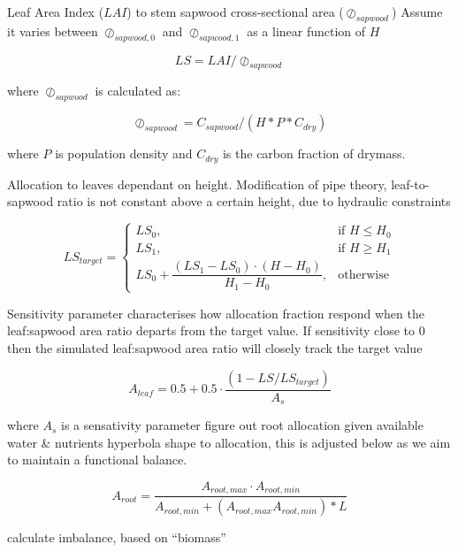 Leaf Area Index ($LAI$) to stem sapwood cross-sectional area ($\oslash_{sapwood}$)
Assume it varies between $\oslash_{sapwood,0}$ and $\oslash_{sapwood,1}$ as a linear function of $H$ 

\begin{equation}
	LS = LAI / \oslash_{sapwood}
\end{equation}

where $\oslash_{sapwood}$ is calculated as:

\begin{equation}
	\oslash_{sapwood} = C_{sapwood}/(H * P *C_{dry} )
\end{equation}

where $P$ is population density and $C_{dry}$ is the carbon fraction of drymass.

Allocation to leaves dependant on height. Modification of pipe theory, leaf-to-sapwood ratio is not constant above a certain  height, due to hydraulic constraints \citep{Magnani2000,Deckmun2006}

\begin{equation}
	LS_{target}=
	\begin{cases}
		    LS_{0},& \text{if } H\le H_{0} \\ 
		    LS_{1},& \text{if } H\ge H_{1} \\
		    LS_{0} + \dfrac{(LS_{1}-LS_{0})\cdot (H-H_{0})}{H_{1}-H_{0}},& \text{otherwise}
		\end{cases}
\end{equation}

Sensitivity parameter characterises how allocation fraction respond when the leaf:sapwood area ratio departs from the target value. If sensitivity close to 0 then the simulated leaf:sapwood area ratio will closely track the target value

\begin{equation}
	A_{leaf} = 0.5 + 0.5 \cdot \dfrac{(1-LS/LS_{target})}{A_{s}}
	\label{AleafAllometric}
\end{equation}

where $A_{s}$ is a sensativity parameter figure out root allocation given available water \& nutrients hyperbola shape to allocation, this is adjusted below as we aim to maintain a functional balance.

\begin{equation}
	A_{root} = \dfrac{A_{root,max} \cdot A_{root,min}}{A_{root,min} + (A_{root,max} A_{root,min})*L}
\end{equation}

calculate imbalance, based on ``biomass''

